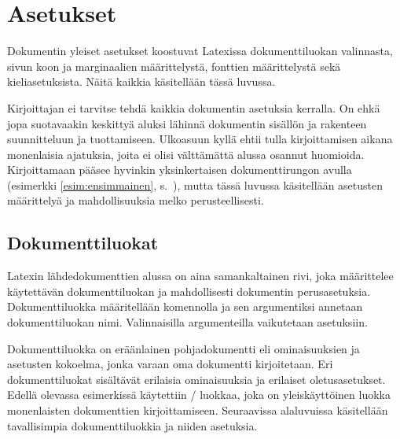 
\chapter{Asetukset}

Dokumentin yleiset asetukset koostuvat Latexissa dokumenttiluokan
valinnasta, sivun koon ja marginaalien määrittelystä, fonttien
määrittelystä sekä kieliasetuksista. Näitä kaikkia käsitellään tässä
luvussa.

Kirjoittajan ei tarvitse tehdä kaikkia dokumentin asetuksia kerralla. On
ehkä jopa suotavaakin keskittyä aluksi lähinnä dokumentin sisällön ja
rakenteen suunnitteluun ja tuottamiseen. Ulkoasuun kyllä ehtii tulla
kirjoittamisen aikana monenlaisia ajatuksia, joita ei olisi välttämättä
alussa osannut huomioida. Kirjoittamaan pääsee hyvinkin yksinkertaisen
dokumenttirungon avulla (esimerkki \ref{esim:ensimmainen},
s.~\pageref{esim:ensimmainen}), mutta tässä luvussa käsitellään
asetusten määrittelyä ja mahdollisuuksia melko perusteellisesti.

\section{Dokumenttiluokat}
\label{luku:dokumenttiluokat}

Latexin lähdedokumenttien alussa on aina samankaltainen rivi, joka
määrittelee käytettävän dokumenttiluokan ja mahdollisesti dokumentin
perusasetuksia. Dokumenttiluokka määritellään komennolla
 ja sen argumentiksi annetaan dokumenttiluokan
nimi. Valinnaisilla argumenteilla vaikutetaan asetuksiin.


Dokumenttiluokka on eräänlainen pohjadokumentti eli ominaisuuksien ja
asetusten kokoelma, jonka varaan oma dokumentti kirjoitetaan. Eri
dokumenttiluokat sisältävät erilaisia ominaisuuksia ja erilaiset
oletusasetukset. Edellä olevassa esimerkissä käytettiin
\-/ luokkaa, joka on yleiskäyttöinen luokka monenlaisten
dokumenttien kirjoittamiseen. Seuraavissa alaluvuissa käsitellään
tavallisimpia dokumenttiluokkia ja niiden asetuksia.

